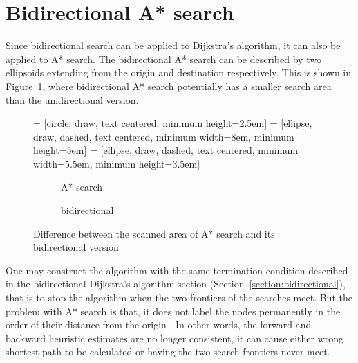 \section{Bidirectional A* search}
Since bidirectional search can be applied to Dijkstra's algorithm,
it can also be applied to A* search.
The bidirectional A* search can be described by two ellipsoids extending from the origin and destination respectively.
This is shown in Figure~\ref{fig:bidirectdiff},
where bidirectional A* search potentially has a smaller search area than the unidirectional version.

\begin{figure}[!ht]
     = [circle, draw, text centered, minimum height=2.5em]
     = [ellipse, draw, dashed, text centered, minimum width=8em, minimum height=5em]
     = [ellipse, draw, dashed, text centered, minimum width=5.5em, minimum height=3.5em]
    \centering
    \begin{subfigure}[t]{.4\textwidth}
        \centering
        \caption{A* search}
    \end{subfigure}
    \begin{subfigure}[t]{.4\textwidth}
        \centering
        \caption{bidirectional}
    \end{subfigure}
    \caption{Difference between the scanned area of A* search and its bidirectional version}
    \label{fig:bidirectdiff}
\end{figure}

One may construct the algorithm with the same termination condition described in the bidirectional Dijkstra's algorithm section (Section~\ref{section:bidirectional}),
that is to stop the algorithm when the two frontiers of the searches meet.
But the problem with A* search is that, it does not label the nodes permanently in the order of their distance from the origin \citep{Klunder}.
In other words, the forward and backward heuristic estimates are no longer consistent,
it can cause either wrong shortest path to be calculated or having the two search frontiers never meet.

